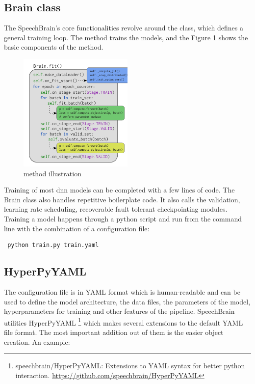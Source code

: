 \subsection{Brain class}
The SpeechBrain's core functionalities revolve around the  class, which defines a general training loop. The  method trains the models, and the Figure \ref{fig:brain} shows the basic components of the method. 

\begin{figure}[ht]
  \begin{center}
    \includegraphics[width=0.5\textwidth]{images/brainclass.png} 
    \caption{ method illustration \cite{Ravanelli2021SpeechBrain:Toolkit}}
    \label{fig:brain}
  \end{center}
\end{figure}

Training of most \acrshort{dnn} models can be completed with a few lines of code. The Brain class also handles repetitive boilerplate code. It also calls the validation, learning rate scheduling, recoverable fault tolerant checkpointing modules. Training a model happens through a python script and run from the command line with the combination of a configuration file: 
\begin{verbatim} python train.py train.yaml\end{verbatim}

\subsection{HyperPyYAML}
The configuration file is in YAML format which is human-readable and can be used to define the model architecture, the data files, the parameters of the model, hyperparameters for training and other features of the pipeline. SpeechBrain utilities HyperPyYAML \footnote{speechbrain/HyperPyYAML:  Extensions  to  YAML  syntax  for  better python interaction. \href{https://github.com/speechbrain/HyperPyYAML}{https://github.com/speechbrain/HyperPyYAML} } which makes several extensions to the default YAML file format. The most important addition out of them is the easier object creation. An example:

